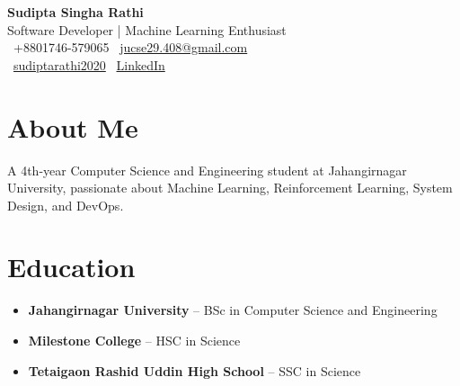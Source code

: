 \documentclass[a4paper,10pt]{article}
\begin{document}
\begin{minipage}{0.65\textwidth}
    {\LARGE\bfseries Sudipta Singha Rathi}\\[0.5em]
    {\large Software Developer | Machine Learning Enthusiast}\\[0.5em]
    \faPhone \ +8801746-579065 \quad
    \faEnvelope \ \href{mailto:jucse29.408@gmail.com}{jucse29.408@gmail.com} \\
    \faGithub \ \href{https://github.com/sudiptarathi2020}{sudiptarathi2020} \quad
    \faLinkedin \ \href{https://linkedin.com/in/sudiptarathi2020}{LinkedIn}
\end{minipage}%
\hfill
\begin{minipage}{0.3\textwidth}
    \centering
\end{minipage}

\vspace{1em}

\section*{About Me}
A 4th-year Computer Science and Engineering student at Jahangirnagar University, passionate about Machine Learning, Reinforcement Learning, System Design, and DevOps.

\section*{Education}
\begin{itemize}[leftmargin=0.5cm]
    \item \textbf{Jahangirnagar University} – BSc in Computer Science and Engineering
    \item \textbf{Milestone College} – HSC in Science
    \item \textbf{Tetaigaon Rashid Uddin High School} – SSC in Science
\end{itemize}
\end{document}
